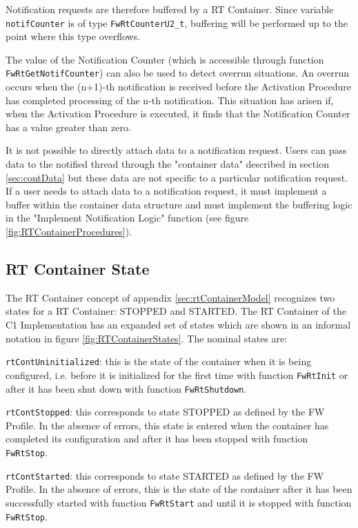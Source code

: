 \documentclass[manual]{../fwprofile}
\begin{document}
Notification requests are therefore buffered by a RT Container. Since variable \texttt{notifCounter} is of type \texttt{FwRtCounterU2\_t}, buffering will be performed up to the point where this type overflows. 

The value of the Notification Counter (which is accessible through function \texttt{FwRtGetNotifCounter}) can also be used to detect overrun situations. An overrun occurs when the (n+1)-th notification is received before the Activation Procedure has completed processing of the n-th notification. This situation has arisen if, when the Activation Procedure is executed, it finds that the Notification Counter has a value greater than zero. 

It is not possible to directly attach data to a notification request. Users can pass data to the notified thread through the "container data" described in section \ref{sec:contData} but these data are not specific to a particular notification request. If a user needs to attach data to a notification request, it must implement a buffer within the container data structure and must implement the buffering logic in the "Implement Notification Logic" function (see figure \ref{fig:RTContainerProcedures}).

\subsection{RT Container State}\label{sec:contState}
The RT Container concept of appendix \ref{sec:rtContainerModel} recognizes two states for a RT Container: STOPPED and STARTED. The RT Container of the C1 Implementation has an expanded set of states which are shown in an informal notation in figure \ref{fig:RTContainerStates}. The nominal states are:

\begin{fw_enumerate}
\item \texttt{rtContUninitialized}: this is the state of the container when it is being configured, i.e. before it is initialized for the first time with function \texttt{FwRtInit} or after it has been shut down with function \texttt{FwRtShutdown}.
\item \texttt{rtContStopped}: this corresponds to state STOPPED as defined by the FW Profile. In the absence of errors, this state is entered when the container has completed its configuration and after it has been stopped with function \texttt{FwRtStop}.
\item \texttt{rtContStarted}: this corresponds to state STARTED as defined by the FW Profile. In the absence of errors, this is the state of the container after it has been successfully started with function \texttt{FwRtStart}  and until it is stopped with function \texttt{FwRtStop}.
\end{fw_enumerate}
\end{document}
